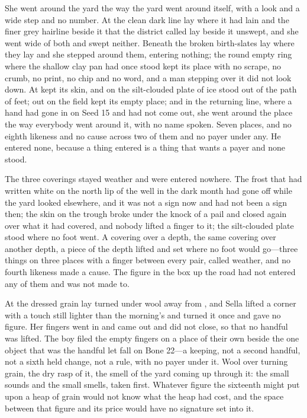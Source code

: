 She went around the yard the way the yard went around itself, with a look and a wide step and no number. At  the clean dark line lay where it had lain and the finer grey hairline beside it that the district called  lay beside it unswept, and she went wide of both and swept neither. Beneath  the broken birth-slates lay where they lay and she stepped around them, entering nothing; the round empty ring where the shallow clay pan had once stood kept its place with no scrape, no crumb, no print, no chip and no word, and a man stepping over it did not look down. At   kept its skin, and on  the silt-clouded plate of ice stood out of the path of feet; out on  the field kept its empty place; and in the returning line, where a hand had gone in on Seed 15 and had not come out, she went around the place the way everybody went around it, with no name spoken. Seven places, and no eighth likeness and no cause across two of them and no payer under any. He entered none, because a thing entered is a thing that wants a payer and none stood.

The three coverings stayed weather and were entered nowhere. The frost that had written white on the north lip of the well in the dark month had gone off while the yard looked elsewhere, and it was not a sign now and had not been a sign then; the skin on the trough broke under the knock of a pail and closed again over what it had covered, and nobody lifted a finger to it; the silt-clouded plate stood where no foot went. A covering over a depth, the same covering over another depth, a piece of the depth lifted and set where no foot would go---three things on three places with a finger between every pair, called weather, and no fourth likeness made a cause. The figure in the box up the road had not entered any of them and was not made to.

\scenebreak

At  the dressed grain lay turned under wool away from , and Sella lifted a corner with a touch still lighter than the morning's and turned it once and gave no figure. Her fingers went in and came out and did not close, so that no handful was lifted. The boy filed the empty fingers on a place of their own beside the one object that was the handful let fall on Bone 22---a keeping, not a second handful, not a sixth held change, not a rule, with no payer under it. Wool over turning grain, the dry rasp of it, the smell of the yard coming up through it: the small sounds and the small smells, taken first. Whatever figure the sixteenth might put upon a heap of grain would not know what the heap had cost, and the space between that figure and its price would have no signature set into it.

